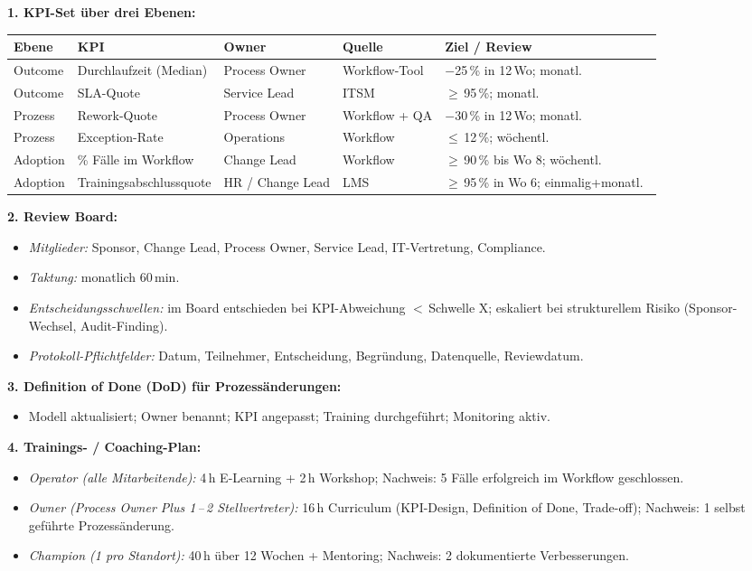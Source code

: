 \documentclass[11pt,a4paper,oneside]{article}
\begin{document}
\begin{loesungbox}
\textbf{1. KPI-Set \"uber drei Ebenen:}

\smallskip
\begin{tabularx}{\linewidth}{@{}p{2.2cm}p{3.6cm}p{2.0cm}p{2.0cm}X@{}}
\toprule
\textbf{Ebene} & \textbf{KPI} & \textbf{Owner} & \textbf{Quelle} & \textbf{Ziel / Review} \\
\midrule
Outcome  & Durchlaufzeit (Median) & Process Owner & Workflow-Tool & $-$25\,\% in 12\,Wo; monatl.\ \\
Outcome  & SLA-Quote              & Service Lead  & ITSM         & $\geq$\,95\,\%; monatl.\ \\
Prozess  & Rework-Quote           & Process Owner & Workflow + QA & $-$30\,\% in 12\,Wo; monatl.\ \\
Prozess  & Exception-Rate         & Operations    & Workflow     & $\leq$\,12\,\%; w\"ochentl.\ \\
Adoption & \% F\"alle im Workflow & Change Lead   & Workflow     & $\geq$\,90\,\% bis Wo 8; w\"ochentl.\ \\
Adoption & Trainingsabschluss\-quote & HR / Change Lead & LMS    & $\geq$\,95\,\% in Wo 6; einmalig+monatl.\ \\
\bottomrule
\end{tabularx}

\smallskip
\textbf{2. Review Board:}
\begin{itemize}
  \item \emph{Mitglieder:} Sponsor, Change Lead, Process Owner, Service Lead, IT-Vertretung, Compliance.
  \item \emph{Taktung:} monatlich 60\,min.
  \item \emph{Entscheidungsschwellen:} im Board entschieden bei KPI-Abweichung $<$\,Schwelle X; eskaliert bei strukturellem Risiko (Sponsor-Wechsel, Audit-Finding).
  \item \emph{Protokoll-Pflichtfelder:} Datum, Teilnehmer, Entscheidung, Begr\"undung, Datenquelle, Reviewdatum.
\end{itemize}

\smallskip
\textbf{3. Definition of Done (DoD) f\"ur Prozess\"anderungen:}
\begin{itemize}
  \item Modell aktualisiert; Owner benannt; KPI angepasst; Training durchgef\"uhrt; Monitoring aktiv.
\end{itemize}

\smallskip
\textbf{4. Trainings- / Coaching-Plan:}
\begin{itemize}
  \item \emph{Operator (alle Mitarbeitende):} 4\,h E-Learning + 2\,h Workshop; Nachweis: 5 F\"alle erfolgreich im Workflow geschlossen.
  \item \emph{Owner (Process Owner Plus 1\,--\,2 Stellvertreter):} 16\,h Curriculum (KPI-Design, Definition of Done, Trade-off); Nachweis: 1 selbst gef\"uhrte Prozess\"anderung.
  \item \emph{Champion (1 pro Standort):} 40\,h \"uber 12 Wochen + Mentoring; Nachweis: 2 dokumentierte Verbesserungen.
\end{itemize}


\end{loesungbox}
\end{document}
